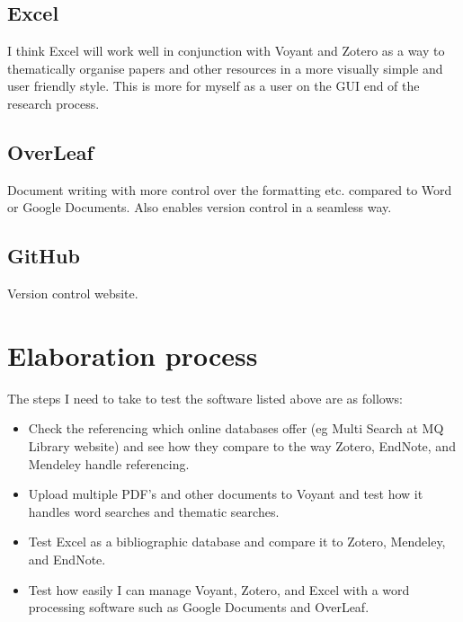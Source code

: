 \documentclass{article}
\begin{document}
\subsection{Excel}

I think Excel will work well in conjunction with Voyant and Zotero as a way to thematically organise papers and other resources in a more visually simple and user friendly style. This is more for myself as a user on the GUI end of the research process.

\subsection{OverLeaf}

Document writing with more control over the formatting etc. compared to Word or Google Documents. Also enables version control in a seamless way.

\subsection{GitHub}

Version control website.

\section{Elaboration process}

The steps I need to take to test the software listed above are as follows:

\begin{itemize}
    \item Check the referencing which online databases offer (eg Multi Search at MQ Library website) and see how they compare to the way Zotero, EndNote, and Mendeley handle referencing.
    \item Upload multiple PDF's and other documents to Voyant and test how it handles word searches and thematic searches.
    \item Test Excel as a bibliographic database and compare it to Zotero, Mendeley, and EndNote.
    \item Test how easily I can manage Voyant, Zotero, and Excel with a word processing software such as Google Documents and OverLeaf.
\end{itemize}
\end{document}
